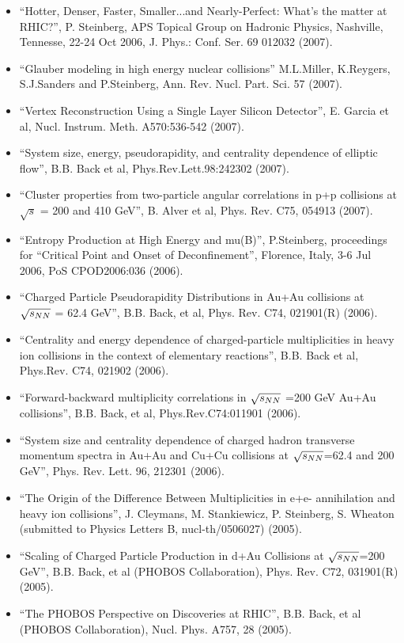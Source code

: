 \documentclass[11 pt]{article}
\begin{document}
\begin{description}
\begin{itemize}
\item ``Hotter, Denser, Faster, Smaller...and Nearly-Perfect: What's the matter at RHIC?'', P. Steinberg, APS Topical Group on Hadronic Physics, Nashville, Tennesse, 22-24 Oct 2006, J. Phys.: Conf. Ser. 69 012032 (2007).
\item  ``Glauber modeling in high energy nuclear collisions'' M.L.Miller, K.Reygers, S.J.Sanders and P.Steinberg, Ann. Rev. Nucl. Part. Sci. 57 (2007).
\item ``Vertex Reconstruction Using a Single Layer Silicon Detector'', E. Garcia et al, Nucl. Instrum. Meth. A570:536-542 (2007).
\item ``System size, energy, pseudorapidity, and centrality dependence of elliptic flow'', B.B. Back et al, Phys.Rev.Lett.98:242302 (2007).
\item ``Cluster properties from two-particle angular correlations in p+p collisions at $\sqrt{s}$ = 200 and 410 GeV'', B. Alver et al, Phys. Rev. C75, 054913 (2007).
\item ``Entropy Production at High Energy and mu(B)'', P.Steinberg, proceedings for ``Critical Point and Onset of Deconfinement'', Florence, Italy, 3-6 Jul 2006, PoS CPOD2006:036 (2006).
\item  ``Charged Particle Pseudorapidity Distributions in Au+Au collisions at $\sqrt{s_{NN}}$ = 62.4 GeV'', B.B. Back, et al, Phys. Rev. C74, 021901(R) (2006).
\item  ``Centrality and energy dependence of charged-particle multiplicities in heavy ion collisions in the context of elementary reactions'', B.B. Back et al, Phys.Rev. C74, 021902 (2006).
\item ``Forward-backward multiplicity correlations in $\sqrt{s_{NN}}$ =200 GeV Au+Au collisions'', B.B. Back, et al, Phys.Rev.C74:011901 (2006).
\item ``System size and centrality dependence of charged hadron transverse momentum spectra in Au+Au and Cu+Cu collisions at $\sqrt{s_{NN}}$=62.4 and 200 GeV'', Phys. Rev. Lett. 96, 212301 (2006).
\item ``The Origin of the Difference Between Multiplicities in e+e- annihilation and heavy ion collisions'', J. Cleymans, M. Stankiewicz, P. Steinberg, S. Wheaton (submitted to Physics Letters B, nucl-th/0506027) (2005).
\item ``Scaling of Charged Particle Production in d+Au Collisions at $\sqrt{s_{NN}}$=200 GeV'', B.B. Back, et al (PHOBOS Collaboration), Phys. Rev. C72, 031901(R) (2005).
\item ``The PHOBOS Perspective on Discoveries at RHIC'', B.B. Back, et al (PHOBOS Collaboration), Nucl. Phys. A757, 28 (2005).

\end{itemize}
\end{description}
\end{document}

